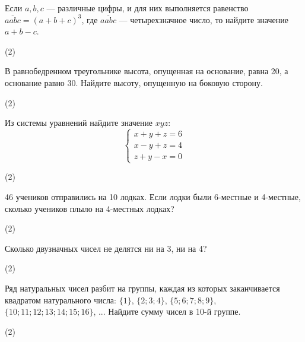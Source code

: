 \documentclass[14pt]{article}
\begin{document}
\begin{taskbox}
Если $a, b, c$ — различные цифры, и для них выполняется равенство $\overline{aabc} = (a+b+c)^3$, где $\overline{aabc}$ — четырехзначное число, то найдите значение $a+b-c$.
\begin{tasks}(2)
\end{tasks}
\end{taskbox}

\begin{taskbox}
В равнобедренном треугольнике высота, опущенная на основание, равна 20, а основание равно 30. Найдите высоту, опущенную на боковую сторону.
\begin{tasks}(2)
\end{tasks}
\end{taskbox}



\begin{taskbox}
Из системы уравнений найдите значение $xyz$:
\[
\begin{cases}
x + y + z = 6\\
x - y + z = 4\\
z + y - x = 0
\end{cases}
\]
\begin{tasks}(2)
\end{tasks}
\end{taskbox}

\begin{taskbox}
46 учеников отправились на 10 лодках. Если лодки были 6-местные и 4-местные, сколько учеников плыло на 4-местных лодках?
\begin{tasks}(2)
\end{tasks}
\end{taskbox}

\begin{taskbox}
Сколько двузначных чисел не делятся ни на 3, ни на 4?
\begin{tasks}(2)
\end{tasks}
\end{taskbox}

\begin{taskbox}
Ряд натуральных чисел разбит на группы, каждая из которых заканчивается квадратом натурального числа: $\{1\}$, $\{2;3;4\}$, $\{5;6;7;8;9\}$, $\{10;11;12;13;14;15;16\}$, ... Найдите сумму чисел в 10-й группе.
\begin{tasks}(2)
\end{tasks}
\end{taskbox}
\end{document}
